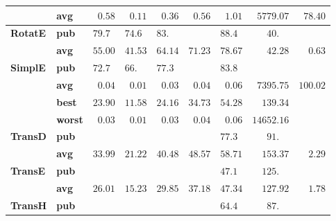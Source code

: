 \begin{tabular}{llrrrrrrr}
       & \textbf{avg} &  $\phantom{0}0.58$ &  $\phantom{0}0.11$ &  $\phantom{0}0.36$ &  $\phantom{0}0.56$ &  $\phantom{0}1.01$ &            $\phantom{0}5779.07$ &  $\phantom{0}78.40$ \\\midrule
\textbf{RotatE} & \textbf{pub} &  $79.7\phantom{0}$ &  $74.6\phantom{0}$ &  $83.\phantom{00}$ &                    &  $88.4\phantom{0}$ &  $\phantom{000}40.\phantom{00}$ &                     \\
       & \textbf{avg} &            $55.00$ &            $41.53$ &            $64.14$ &            $71.23$ &            $78.67$ &            $\phantom{000}42.28$ &  $\phantom{00}0.63$ \\\midrule
\textbf{SimplE} & \textbf{pub} &  $72.7\phantom{0}$ &  $66.\phantom{00}$ &  $77.3\phantom{0}$ &                    &  $83.8\phantom{0}$ &                                 &                     \\
       & \textbf{avg} &  $\phantom{0}0.04$ &  $\phantom{0}0.01$ &  $\phantom{0}0.03$ &  $\phantom{0}0.04$ &  $\phantom{0}0.06$ &            $\phantom{0}7395.75$ &            $100.02$ \\
       & \textbf{best} &            $23.90$ &            $11.58$ &            $24.16$ &            $34.73$ &            $54.28$ &            $\phantom{00}139.34$ &                     \\
       & \textbf{worst} &  $\phantom{0}0.03$ &  $\phantom{0}0.01$ &  $\phantom{0}0.03$ &  $\phantom{0}0.04$ &  $\phantom{0}0.06$ &                      $14652.16$ &                     \\\midrule
\textbf{TransD} & \textbf{pub} &                    &                    &                    &                    &  $77.3\phantom{0}$ &  $\phantom{000}91.\phantom{00}$ &                     \\
       & \textbf{avg} &            $33.99$ &            $21.22$ &            $40.48$ &            $48.57$ &            $58.71$ &            $\phantom{00}153.37$ &  $\phantom{00}2.29$ \\\midrule
\textbf{TransE} & \textbf{pub} &                    &                    &                    &                    &  $47.1\phantom{0}$ &  $\phantom{00}125.\phantom{00}$ &                     \\
       & \textbf{avg} &            $26.01$ &            $15.23$ &            $29.85$ &            $37.18$ &            $47.34$ &            $\phantom{00}127.92$ &  $\phantom{00}1.78$ \\\midrule
\textbf{TransH} & \textbf{pub} &                    &                    &                    &                    &  $64.4\phantom{0}$ &  $\phantom{000}87.\phantom{00}$ &                     \\

\end{tabular}

